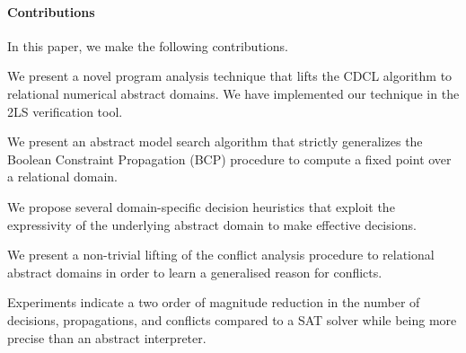 \paragraph{Contributions}
In this paper, we make the following contributions.
\begin{compactenum}
\item We present a novel program analysis technique that 
lifts the CDCL algorithm to relational numerical abstract domains.   
We have implemented our technique in the 2LS verification tool.  

\item We present an abstract model search algorithm that strictly 
generalizes the Boolean Constraint Propagation (BCP) procedure to
compute a fixed point over a relational domain.  

\item We propose several domain-specific decision heuristics that 
exploit the expressivity of the underlying abstract domain to make 
effective decisions. 

\item We present a non-trivial lifting of the conflict analysis procedure 
to relational abstract domains in order to learn a generalised reason 
for conflicts.  
 
\item  Experiments indicate a two order of magnitude reduction 
in the number of decisions, propagations, and conflicts compared 
to a SAT solver while being more precise than an abstract interpreter.  
\end{compactenum}
